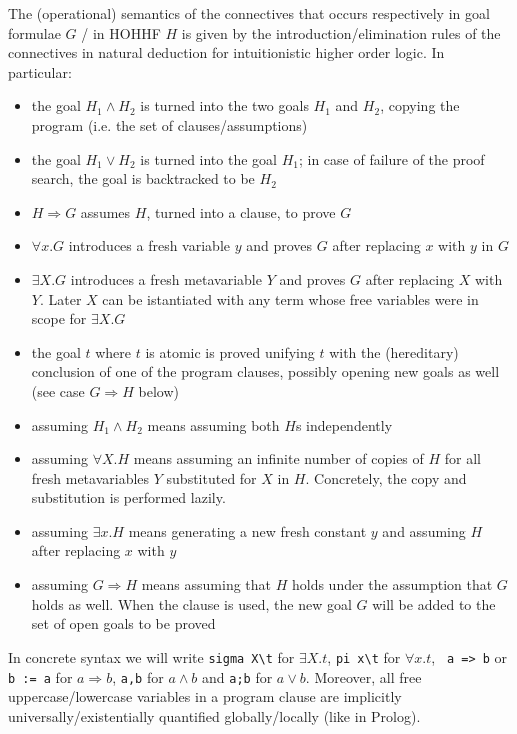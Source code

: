 \documentclass[preprint]{sigplanconf}
\begin{document}
The (operational) semantics of the connectives that occurs respectively in goal formulae $G$ / in HOHHF $H$ is given by the introduction/elimination rules of the connectives in natural deduction for intuitionistic higher order logic. In particular:
\begin{itemize}
\item the goal $H_1 \wedge H_2$ is turned into the two goals $H_1$ and $H_2$,
 copying the program (i.e. the set of clauses/assumptions)
\item the goal $H_1 \vee H_2$ is turned into the goal $H_1$; in case of failure of the proof search, the goal is backtracked to be $H_2$
\item $H \Rightarrow G$ assumes $H$, turned into a clause, to prove $G$
\item $\forall x.G$ introduces a fresh variable $y$ and proves $G$ after replacing $x$ with $y$ in $G$
\item $\exists X.G$ introduces a fresh metavariable $Y$ and proves $G$ after replacing $X$ with $Y$. Later $X$ can be istantiated with any term whose free variables were in scope for $\exists X.G$
\item the goal $t$ where $t$ is atomic is proved unifying $t$ with the
(hereditary) conclusion of one of the program clauses, possibly opening new
goals as well (see case $G \Rightarrow H$ below)
\item assuming $H_1 \wedge H_2$ means assuming both $H$s independently
\item assuming $\forall X.H$ means assuming an infinite number of copies of $H$ for all fresh metavariables $Y$ substituted for $X$ in $H$. Concretely, the copy and substitution is performed lazily.
\item assuming $\exists x.H$ means generating a new fresh constant $y$ and assuming $H$ after replacing $x$ with $y$
\item assuming $G \Rightarrow H$ means assuming that $H$ holds under the assumption that $G$ holds as well. When the clause is used, the new goal $G$ will be added to the set of open goals to be proved
\end{itemize}

In concrete syntax we will write \verb+sigma X\t+ for $\exists X.t$, \verb+pi x\t+ for $\forall x.t$, \verb+ a => b+ or \verb+b := a+ for $a \Rightarrow b$, \verb+a,b+ for $a \wedge b$ and \verb+a;b+ for $a \vee b$. Moreover, all free uppercase/lowercase variables in a program clause are implicitly universally/existentially quantified globally/locally (like in Prolog).
\end{document}
